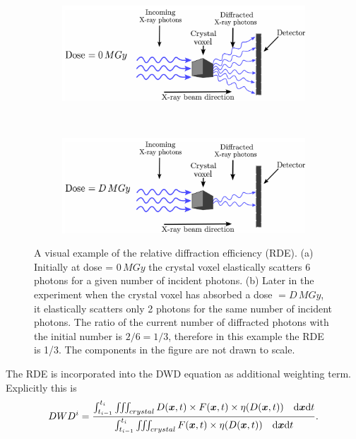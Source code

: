 \begin{figure}
        \centering
        \begin{subfigure}[b]{1\textwidth}
                \centering
                \includegraphics[width=\textwidth]{figures/dwd/rde1.pdf}
                \caption{}
                \label{fig:Graphical depiction of RDE - 0 MGy}
        \end{subfigure}
				\\
        \begin{subfigure}[b]{1\textwidth}
                \centering
                \includegraphics[width=\textwidth]{figures/dwd/rde2.pdf}
                \caption{}
                \label{fig:Graphical depiction of RDE - D MGy}
        \end{subfigure}
        \caption{A visual example of the relative diffraction efficiency (RDE).
        (a) Initially at dose = $0\, MGy$ the crystal voxel elastically scatters 6 photons for a given number of incident photons.
        (b) Later in the experiment when the crystal voxel has absorbed a dose $= D\, MGy$, it elastically scatters only 2 photons for the same number of incident photons.
        The ratio of the current number of diffracted photons with the initial number is $2/6 = 1/3$, therefore in this example the RDE is 1/3.
        The components in the figure are not drawn to scale.}
        \label{fig: Graphical depiction of RDE}
\end{figure}

The RDE is incorporated into the DWD equation as additional weighting term.
Explicitly this is
\begin{equation}
    DWD^i = \frac{\int_{t_{i-1}}^{t_{i}} \iiint_{crystal} D(\boldsymbol{x},t) \times F(\boldsymbol{x},t) \times \eta(D(\boldsymbol{x},t)) \quad \mathrm{d}\boldsymbol{x}\mathrm{d} t}{\int_{t_{i-1}}^{t_{i}} \iiint_{crystal}F(\boldsymbol{x},t) \times \eta(D(\boldsymbol{x},t)) \quad \mathrm{d}\boldsymbol{x}\mathrm{d} t}.
    \label{eq:DWD equation with RDE}
\end{equation}

